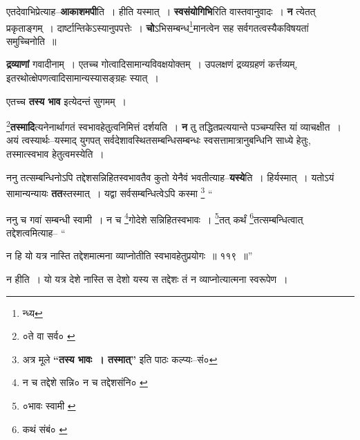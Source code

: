 \documentclass[article,12pt,a4paper]{memoir}
\begin{document}
	  \pstart एतदेवाभिप्रेत्याह--\textbf{आकाशमपी}ति । हीति यस्मात् । \textbf{स्वसंयोगिभि}रिति वास्तवानुवादः । \textbf{न} त्येतत् प्रकृताङ्गम् । दार्ष्टान्तिकेऽस्यानुपपत्तेः । \textbf{चो}ऽभिसम्बन्ध\footnote{न्ध्य}\-मानत्वेन सह सर्वगतत्वस्यैकविषयतां समुच्चिनोति ॥
	\pend
      

	  \pstart \textbf{द्रव्याणां} गवादीनाम् । एतच्च गोत्वादिसामान्यविवक्षयोक्तम् । उपलक्षणं द्रव्यग्रहणं कर्त्तव्यम्, इतरथोत्क्षेपणत्वादिसामान्यस्यासङ्ग्रहः स्यात् ।
	\pend
      

	  \pstart एतच्च \textbf{तस्य भाव} इत्येदन्तं सुगमम् ।
	\pend
      

	  \pstart \footnote{०ते वा सर्व० \cite{dp-msB}}\textbf{तस्मादि}त्यनेनार्थागतं स्वभावहेतुत्वनिमित्तं दर्शयति । \textbf{न} तु तद्धितप्रत्ययान्ते पञ्चम्यस्ति यां व्याचक्षीत । अयं त्वस्यार्थः--यस्माद् युगपत् सर्वदेशावस्थितसम्बन्धिसम्बन्धः स्वसत्तामात्रानुबन्धिनि साध्ये हेतुः, तस्मात्स्वभाव हेतुत्वमस्येति ।
	\pend
      

	  \pstart ननु तत्सम्बन्धिनोऽपि तद्देशसन्निहितस्वभावतैव कुतो येनैवं भवतीत्याह--\textbf{यस्ये}ति । हिर्यस्मात् । यतोऽयं सामान्यन्यायः \textbf{तत}स्त\leavevmode{}स्मात् । यद्वा सर्वसम्बन्धित्वेऽपि कस्मा  \footnote{अत्र मूले \textbf{“तस्य भावः । तस्मात्”} इति पाठः कल्प्यः--सं०} \leavevmode{} “
	  
	ननु च गवां सम्बन्धी स्वामी । न च \footnote{न च तद्देशे सन्नि० \cite{dp-msA} \cite{dp-msB} \cite{dp-edP} \cite{dp-edH} \cite{dp-edE} न च तद्देशसंनि० \cite{dp-edN}}\-गोदेशे सन्निहितस्वभावः । \footnote{०भावः स्वामी \cite{dp-msA} \cite{dp-msB} \cite{dp-edP} \cite{dp-edH} \cite{dp-edE} \cite{dp-edN}}\-तत् कर्थं \footnote{कथं संबं० \cite{dp-msA} \cite{dp-msB} \cite{dp-msC} \cite{dp-msD} \cite{dp-edP} \cite{dp-edH} \cite{dp-edN}}\-तत्सम्बन्धित्वात् तद्देशत्वमित्याह-- “
	  
	न हि यो यत्र नास्ति तद्देशमात्मना व्याप्नोतीति स्वभावहेतुप्रयोगः ॥ ११९ ॥” 
	  
	न हीति । यो यत्र देशे नास्ति स देशो यस्य स तद्देशः तं न व्याप्नोत्यात्मना स्वरूपेण । 
	  
\end{document}
